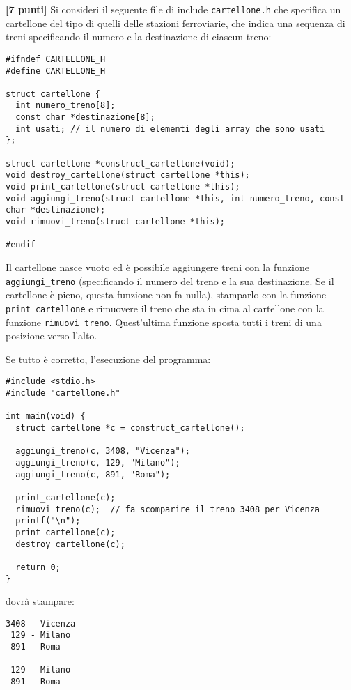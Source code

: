 \documentclass{article}[10pt]
\newcounter{esnu}
\newenvironment{esercizio}{\medskip \noindent {\bf Esercizio\addtocounter{esnu}{1} \arabic{esnu}}}{}
\begin{document}
\newpage

\begin{esercizio}
\textbf{[7 punti]}
Si consideri il seguente file di include \texttt{cartellone.h} che specifica
un cartellone del tipo di quelli delle stazioni ferroviarie, che indica una sequenza
di treni specificando il numero e la destinazione di ciascun treno:

{\small
\begin{verbatim}
#ifndef CARTELLONE_H
#define CARTELLONE_H

struct cartellone {
  int numero_treno[8];
  const char *destinazione[8];
  int usati; // il numero di elementi degli array che sono usati
};

struct cartellone *construct_cartellone(void);
void destroy_cartellone(struct cartellone *this);
void print_cartellone(struct cartellone *this);
void aggiungi_treno(struct cartellone *this, int numero_treno, const char *destinazione);
void rimuovi_treno(struct cartellone *this);

#endif
\end{verbatim}
}

\noindent
Il cartellone nasce vuoto ed \`e
possibile aggiungere treni con la funzione
\texttt{aggiungi\_treno} (specificando il numero del treno e la sua destinazione. Se il cartellone
\`e pieno, questa funzione non fa nulla),
stamparlo con la funzione \texttt{print\_cartellone} e rimuovere il treno che sta in cima
al cartellone con la funzione \texttt{rimuovi\_treno}. Quest'ultima funzione
sposta tutti i treni di una posizione verso l'alto.

Se tutto \`e corretto, l'esecuzione del programma:

{\small
\begin{verbatim}
#include <stdio.h>
#include "cartellone.h"

int main(void) {
  struct cartellone *c = construct_cartellone();

  aggiungi_treno(c, 3408, "Vicenza");
  aggiungi_treno(c, 129, "Milano");
  aggiungi_treno(c, 891, "Roma");

  print_cartellone(c);
  rimuovi_treno(c);  // fa scomparire il treno 3408 per Vicenza
  printf("\n");
  print_cartellone(c);
  destroy_cartellone(c);

  return 0;
}
\end{verbatim}
}
\noindent
dovr\`a stampare:

{\small
\begin{verbatim}
3408 - Vicenza
 129 - Milano
 891 - Roma

 129 - Milano
 891 - Roma
\end{verbatim}
}
%
\end{esercizio}
%
\end{document}
